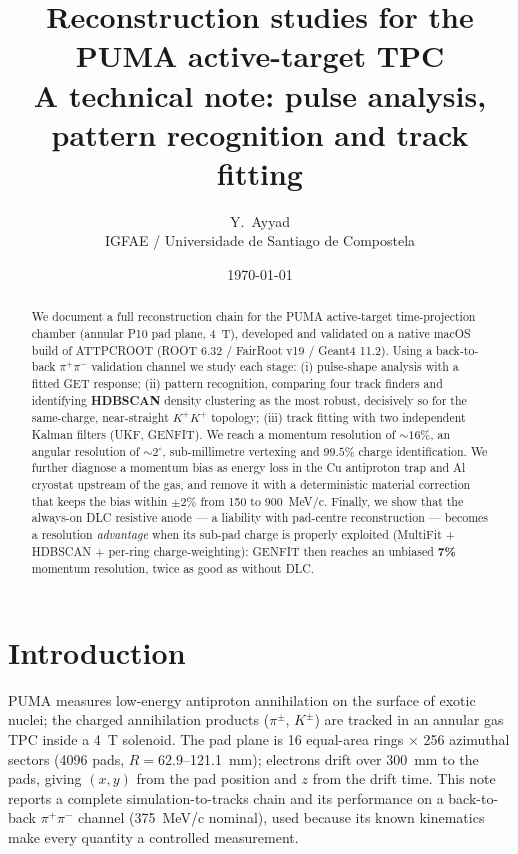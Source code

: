 \documentclass[11pt,a4paper]{article}
\title{\vspace{-1.2cm}\textbf{Reconstruction studies for the PUMA active-target TPC}\\[2pt]
\large A technical note: pulse analysis, pattern recognition and track fitting}
\author{Y.\ Ayyad \\ \small IGFAE / Universidade de Santiago de Compostela}
\date{\today}
\begin{document}
\maketitle
\vspace{-0.6cm}

\begin{abstract}\small
\noindent We document a full reconstruction chain for the PUMA active-target time-projection chamber
(annular P10 pad plane, \SI{4}{\tesla}), developed and validated on a native macOS build of
ATTPCROOT (ROOT 6.32 / FairRoot v19 / Geant4 11.2). Using a back-to-back $\pi^+\pi^-$ validation
channel we study each stage: (i) pulse-shape analysis with a fitted GET response; (ii) pattern
recognition, comparing four track finders and identifying \textbf{HDBSCAN} density clustering as the
most robust, decisively so for the same-charge, near-straight $K^+K^+$ topology; (iii) track fitting
with two independent Kalman filters (UKF, GENFIT). We reach a momentum resolution of
$\sim\!16\%$, an angular resolution of $\sim\!2^\circ$, sub-millimetre vertexing and $99.5\%$
charge identification. We further diagnose a momentum bias as energy loss in the Cu antiproton
trap and Al cryostat upstream of the gas, and remove it with a deterministic material correction
that keeps the bias within $\pm2\%$ from 150 to \SI{900}{MeV/c}. Finally, we show that the always-on
DLC resistive anode --- a liability with pad-centre reconstruction --- becomes a resolution
\emph{advantage} when its sub-pad charge is properly exploited (MultiFit + HDBSCAN + per-ring
charge-weighting): GENFIT then reaches an unbiased \textbf{7\%} momentum resolution, twice as good as
without DLC.
\end{abstract}

\section{Introduction}
PUMA measures low-energy antiproton annihilation on the surface of exotic nuclei; the charged
annihilation products ($\pi^\pm$, $K^\pm$) are tracked in an annular gas TPC inside a \SI{4}{\tesla}
solenoid. The pad plane is 16 equal-area rings $\times$ 256 azimuthal sectors (4096 pads,
$R=62.9$--\SI{121.1}{mm}); electrons drift over \SI{300}{mm} to the pads, giving $(x,y)$ from the
pad position and $z$ from the drift time. This note reports a complete simulation-to-tracks chain
and its performance on a back-to-back $\pi^+\pi^-$ channel (\SI{375}{MeV/c} nominal), used because
its known kinematics make every quantity a controlled measurement.
\end{document}
